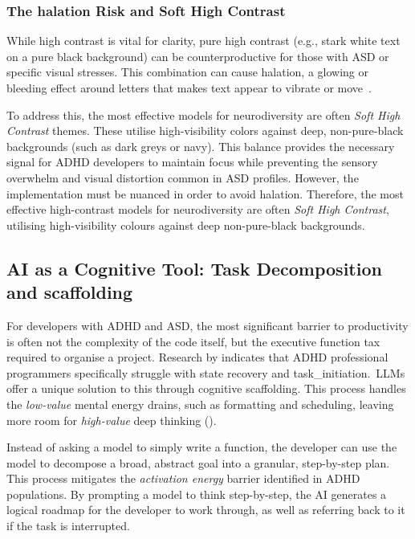 \subsubsection{The \Gls{halation} Risk and Soft High Contrast}
While high contrast is vital for clarity, pure high contrast (e.g., stark white text on a pure black background) can be counterproductive for those with \gls{ASD} or specific visual stresses.
 This combination can cause \gls{halation}, a glowing or bleeding effect around letters that makes text appear to vibrate or move~\cite{cruz2025empiricalinvestigationexperiencesdyslexic}.

 To address this, the most effective models for \gls{neurodiversity} are often \textit{Soft High Contrast} themes. These utilise high-visibility colors against deep, non-pure-black backgrounds 
 (such as dark greys or navy). This balance provides the necessary signal for \gls{ADHD} developers to maintain focus while preventing the sensory overwhelm and visual distortion common in \gls{ASD} profiles.
However, the implementation must be nuanced in order to avoid \gls{halation}.
Therefore, the most effective high-contrast models for \gls{neurodiversity} are often \textit{Soft High Contrast}, utilising high-visibility colours against deep non-pure-black backgrounds.

\subsection{\gls{AI} as a Cognitive Tool: Task Decomposition and \Gls{scaffolding}}
For developers with \gls{ADHD} and \gls{ASD}, the most significant barrier to productivity is often not the complexity of the code itself, but the executive function tax required to organise a project. 
Research by \textcite{newman2025get} indicates that \gls{ADHD} professional programmers specifically struggle with state recovery and \gls{task_initiation}.~\glspl{LLM} offer a unique solution to this 
through cognitive \gls{scaffolding}. This process handles the \textit{low-value} mental energy drains, such as formatting and scheduling, leaving more room for \textit{high-value} deep thinking (\cite{Navigati93:online}).

Instead of asking a model to simply write a function, the developer can use the model to decompose a broad, abstract goal into a granular, step-by-step plan. This process mitigates the \textit{activation energy} barrier identified in \gls{ADHD} populations. By prompting a model to 
think step-by-step, the \gls{AI} generates a logical roadmap for the developer to work through, as well as referring back to it if the task is interrupted.

